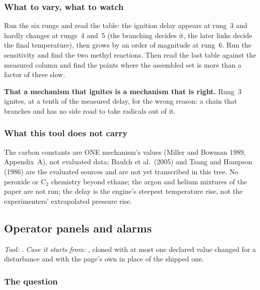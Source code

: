 \documentclass[11pt,a4paper]{article}
\begin{document}
\subsubsection*{What to vary, what to watch}

\begin{tryit}
Run the six rungs and read the table: the ignition delay appears at rung~3 and
hardly changes at rungs~4 and~5 (the branching decides it, the later links decide
the final temperature), then grows by an order of magnitude at rung~6.  Run the
sensitivity and find the two methyl reactions.  Then read the last table against
the measured column and find the points where the assembled set is more than a
factor of three slow.
\end{tryit}

\begin{pitfall}
\textbf{That a mechanism that ignites is a mechanism that is right.}  Rung~3
ignites, at a tenth of the measured delay, for the wrong reason: a chain that
branches and has no side road to take radicals out of it.
\end{pitfall}

\subsubsection*{What this tool does not carry}

The carbon constants are ONE mechanism's values (Miller and Bowman 1989,
Appendix~A), not evaluated data; Baulch et al.\ (2005) and Tsang and Hampson (1986)
are the evaluated sources and are not yet transcribed in this tree.  No peroxide
or C$_2$ chemistry beyond ethane; the argon and helium mixtures of the paper are
not run; the delay is the engine's steepest temperature rise, not the
experimenters' extrapolated pressure rise.

\subsection{Operator panels and alarms}\label{sec:edu-operator-panels}


\noindent\textit{\small Tool:} .  \textit{\small
Case it starts from:} ,
cloned with at most one declared value changed for a disturbance and with the
page's own  in place of the shipped one.

\subsubsection*{The question}
\end{document}
